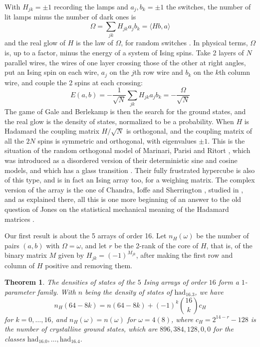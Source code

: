 \documentclass[11pt,a4paper]{article}
\newtheorem{introthm}{Theorem}
\theoremstyle{remark}
\begin{document}
With $H_{jk}=\pm1$ recording the lamps and $a_j,b_k=\pm1$ the switches, the number of lit lamps minus the number of dark ones is
\[
 \Omega=\sum_{jk}H_{jk}a_jb_k=\langle Hb,a\rangle
\]
and the real glow of $H$ is the law of $\Omega$, for random switches \cite{bhm,ba1}. In physical terms, $\Omega$ is, up to a factor, minus the energy of a system of Ising spins. Take 2 layers of $N$ parallel wires, the wires of one layer crossing those of the other at right angles, put an Ising spin on each wire, $a_j$ on the $j$th row wire and $b_k$ on the $k$th column wire, and couple the 2 spins at each crossing:
\[
 E(a,b)=-\frac{1}{\sqrt N}\sum_{jk}H_{jk}a_jb_k=-\frac{\Omega}{\sqrt N}
\]
The game of Gale and Berlekamp is then the search for the ground states, and the real glow is the density of states, normalized to be a probability. When $H$ is Hadamard the coupling matrix $H/\sqrt N$ is orthogonal, and the coupling matrix of all the $2N$ spins is symmetric and orthogonal, with eigenvalues $\pm1$. This is the situation of the random orthogonal model of Marinari, Parisi and Ritort \cite{mp1,mp2}, which was introduced as a disordered version of their deterministic sine and cosine models, and which has a glass transition \cite{cdl,mp2,ppo}. Their fully frustrated hypercube \cite{mp3} is also of this type, and is in fact an Ising array too, for a weighing matrix. The complex version of the array is the one of Chandra, Ioffe and Sherrington \cite{cis}, studied in \cite{cot}, and as explained there, all this is one more beginning of an answer to the old question of Jones on the statistical mechanical meaning of the Hadamard matrices \cite{jo2}.

Our first result is about the 5 arrays of order 16. Let $n_H(\omega)$ be the number of pairs $(a,b)$ with $\Omega=\omega$, and let $r$ be the 2-rank of the core of $H$, that is, of the binary matrix $M$ given by $H_{jk}=(-1)^{M_{jk}}$, after making the first row and column of $H$ positive and removing them.

\begin{samepage}
\begin{introthm}\label{intro:spectrum}
The densities of states of the $5$ Ising arrays of order $16$ form a $1$-parameter family. With $n$ being the density of states of $\mathrm{had}_{16.3}$, we have
\[
 n_H(64-8k)=n(64-8k)+(-1)^k\binom{16}{k}c_H
\]
for $k=0,\ldots,16$, and $n_H(\omega)=n(\omega)$ for $\omega=4(8)$, where $c_H=2^{14-r}-128$ is the number of crystalline ground states, which are $896,384,128,0,0$ for the classes $\mathrm{had}_{16.0},\ldots,\mathrm{had}_{16.4}$.
\end{introthm}
\end{samepage}
\end{document}
